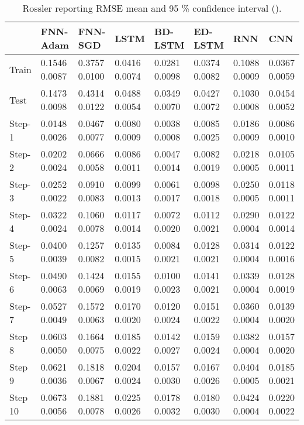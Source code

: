 \documentclass[final,5p,times,twocolumn]{elsarticle}
\begin{document}
\begin{table*}[htbp]
 \small 
\begin{tabular}{llllllll}
\hline
 &  FNN-Adam& FNN-SGD & LSTM & BD-LSTM  & ED-LSTM & RNN& CNN \\
\hline
\hline
		
Train &      
0.1546	0.0087&
0.3757	0.0100&
0.0416	0.0074&
0.0281	0.0098&
0.0374	0.0082&
0.1088	0.0009&0.0367		0.0059\\
Test &      
0.1473	0.0098&
0.4314	0.0122&
0.0488	0.0054&
0.0349	0.0070&
0.0427	0.0072&
0.1030	0.0008&	0.0454		0.0052\\
Step-1 &      
0.0148	0.0026&
0.0467	0.0077&
0.0080	0.0009&
0.0038	0.0008&
0.0085	0.0025&
0.0186	0.0009&	0.0086		0.0010\\
Step-2 &      
0.0202	0.0024&
0.0666	0.0058&
0.0086	0.0011&
0.0047	0.0014&
0.0082	0.0019&
0.0218	0.0005&0.0105		0.0011\\
Step-3 &      
0.0252	0.0022&
0.0910	0.0083&
0.0099	0.0013&
0.0061	0.0017&
0.0098	0.0018&
0.0250	0.0005&	0.0118		0.0011\\
Step-4 &      
0.0322	0.0024&
0.1060	0.0078&
0.0117	0.0014&
0.0072	0.0020&
0.0112	0.0021&
0.0290	0.0004&	0.0122		0.0014\\
Step-5 &      
0.0400	0.0039&
0.1257	0.0082&
0.0135	0.0015&
0.0084	0.0021&
0.0128	0.0021&
0.0314	0.0004&0.0122		0.0016\\
Step-6 &      
0.0490	0.0063&
0.1424	0.0069&
0.0155	0.0019&
0.0100	0.0023&
0.0141	0.0021&
0.0339	0.0004&	0.0128		0.0019\\
Step-7 &      
0.0527	0.0049&
0.1572	0.0063&
0.0170	0.0020&
0.0120	0.0024&
0.0151	0.0022&
0.0360	0.0004&	0.0139		0.0020\\
Step 8 &      
0.0603	0.0050&
0.1664	0.0075&
0.0185	0.0022&
0.0142	0.0027&
0.0159	0.0024&
0.0382	0.0004&	0.0157		0.0020\\
Step 9 &      
0.0621	0.0036&
0.1818	0.0067&
0.0204	0.0024&
0.0157	0.0030&
0.0167	0.0026&
0.0404	0.0005&	0.0185		0.0021\\
Step 10 &      
0.0673	0.0056&
0.1881	0.0078&
0.0225	0.0026&
0.0178	0.0032&
0.0180	0.0030&
0.0424	0.0004&	0.0220		0.0022\\
\hline
 
\end{tabular}
\caption{Rossler reporting RMSE mean and 95 \% confidence interval   ().}
\label{tab:rossler}
\end{table*}





\end{document}
